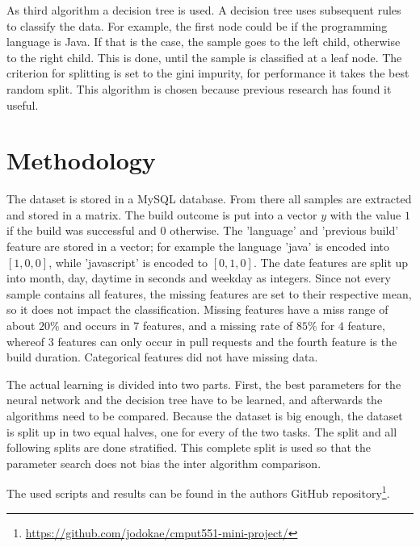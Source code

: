 \documentclass[a4paper,11pt]{article}
\begin{document}
As third algorithm a decision tree is used. A decision tree uses subsequent rules to classify the data. For example, the first node could be if the programming language is Java. If that is the case, the sample goes to the left child, otherwise to the right child. This is done, until the sample is classified at a leaf node. The criterion for splitting is set to the gini impurity, for performance it takes the best random split. This algorithm is chosen because previous research has found it useful.


\section{Methodology}

The dataset is stored in a MySQL database. From there all samples are extracted and stored in a matrix. The build outcome is put into a vector $y$ with the value $1$ if the build was successful and $0$ otherwise. The 'language' and 'previous build' feature are stored in a vector; for example the language 'java' is encoded into $[1,0,0]$, while 'javascript' is encoded to $[0,1,0]$. The date features are split up into month, day, daytime in seconds and weekday as integers. 
Since not every sample contains all features, the missing features are set to their respective mean, so it does not impact the classification. Missing features have a miss range of about $20\%$ and occurs in $7$ features, and a missing rate of $85\%$ for $4$ feature, whereof $3$ features can only occur in pull requests and the fourth feature is the build duration. Categorical features did not have missing data. 

The actual learning is divided into two parts. First, the best parameters for the neural network and the decision tree have to be learned, and afterwards the algorithms need to be compared. Because the dataset is big enough, the dataset is split up in two equal halves, one for every of the two tasks. The split and all following splits are done stratified. This complete split is used so that the parameter search does not bias the inter algorithm comparison. 

The used scripts and results can be found in the authors GitHub repository\footnote{\url{https://github.com/jodokae/cmput551-mini-project/}}.


\end{document}
